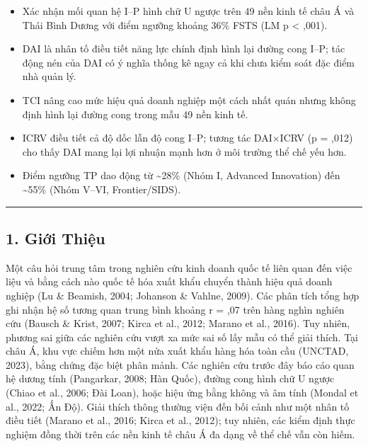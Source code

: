 \documentclass[12pt,a4paper]{article}
\providecommand{\tightlist}{\setlength{\itemsep}{0pt}\setlength{\parskip}{0pt}}
\begin{document}
\begin{itemize}
\tightlist
\item
  Xác nhận mối quan hệ I--P hình chữ U ngược trên 49 nền kinh tế châu Á
  và Thái Bình Dương với điểm ngưỡng khoảng 36\% FSTS (LM p \textless{}
  ,001).
\item
  DAI là nhân tố điều tiết năng lực chính định hình lại đường cong I--P;
  tác động nén của DAI có ý nghĩa thống kê ngay cả khi chưa kiểm soát
  đặc điểm nhà quản lý.
\item
  TCI nâng cao mức hiệu quả doanh nghiệp một cách nhất quán nhưng không
  định hình lại đường cong trong mẫu 49 nền kinh tế.
\item
  ICRV điều tiết cả độ dốc lẫn độ cong I--P; tương tác DAI×ICRV (p =
  ,012) cho thấy DAI mang lại lợi nhuận mạnh hơn ở môi trường thể chế
  yếu hơn.
\item
  Điểm ngưỡng TP dao động từ \textasciitilde28\% (Nhóm I, Advanced
  Innovation) đến \textasciitilde55\% (Nhóm V--VI, Frontier/SIDS).
\end{itemize}

\begin{center}\rule{0.5\linewidth}{0.5pt}\end{center}

\hypertarget{1-giux1edbi-thiux1ec7u}{%
\subsection{1. Giới Thiệu}\label{1-giux1edbi-thiux1ec7u}}

Một câu hỏi trung tâm trong nghiên cứu kinh doanh quốc tế liên quan đến
việc liệu và bằng cách nào quốc tế hóa xuất khẩu chuyển thành hiệu quả
doanh nghiệp (Lu \& Beamish, 2004; Johanson \& Vahlne, 2009). Các phân
tích tổng hợp ghi nhận hệ số tương quan trung bình khoảng r = ,07 trên
hàng nghìn nghiên cứu (Bausch \& Krist, 2007; Kirca et al., 2012; Marano
et al., 2016). Tuy nhiên, phương sai giữa các nghiên cứu vượt xa mức sai
số lấy mẫu có thể giải thích. Tại châu Á, khu vực chiếm hơn một nửa xuất
khẩu hàng hóa toàn cầu (UNCTAD, 2023), bằng chứng đặc biệt phân mảnh.
Các nghiên cứu trước đây báo cáo quan hệ dương tính (Pangarkar, 2008;
Hàn Quốc), đường cong hình chữ U ngược (Chiao et al., 2006; Đài Loan),
hoặc hiệu ứng bằng không và âm tính (Mondal et al., 2022; Ấn Độ). Giải
thích thông thường viện đến bối cảnh như một nhân tố điều tiết (Marano
et al., 2016; Kirca et al., 2012); tuy nhiên, các kiểm định thực nghiệm
đồng thời trên các nền kinh tế châu Á đa dạng về thể chế vẫn còn hiếm.
\end{document}
